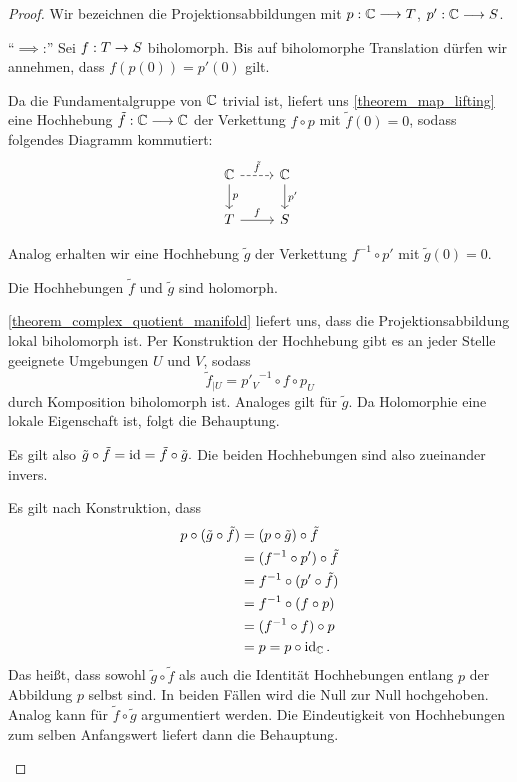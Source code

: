 \begin{proof}
	Wir bezeichnen die Projektionsabbildungen mit \(p:\mathbb{C}\longrightarrow T\), \(p':\mathbb{C}\longrightarrow S\).
	

	\enquote{\(\implies\):} 
	Sei \(f: T \rightarrow S\) biholomorph. Bis auf biholomorphe Translation dürfen wir annehmen, dass 
	\(f(p(0)) = p'(0)\) gilt.
	
	Da die Fundamentalgruppe von \(\mathbb{C}\) trivial ist, liefert uns \cref{theorem_map_lifting} eine Hochhebung \(\tilde{f}:\mathbb{C}\longrightarrow \mathbb{C}\) der Verkettung \(f\circ p\) mit $\tilde{f}(0) = 0$, sodass folgendes Diagramm kommutiert:
	\begin{equation*}
	\begin{tikzcd}
		\C 
		\ar[d,"p"] 
		\ar[r, "\tilde{f}", dashed] 
		& \C
		\ar[d,"p'"]
		\\ 
		T 
		\ar[r,"f"] 
		& S
	\end{tikzcd}
	\end{equation*}

	Analog erhalten wir eine Hochhebung $\tilde{g}$ der Verkettung $f^{-1} \circ p'$ mit $\tilde{g}(0) = 0.$ 

	\begin{claim}
		Die Hochhebungen \(\tilde{f}\) und \(\tilde{g}\) sind holomorph.
	\end{claim}
	\begin{proofofclaim}
		\cref{theorem_complex_quotient_manifold} liefert uns, dass die Projektionsabbildung lokal biholomorph ist. Per Konstruktion der Hochhebung gibt es an jeder Stelle geeignete Umgebungen $U$ und $V$, sodass \[\tilde{f}_{|U}={p'_V}^{-1}\circ f\circ p_U\] durch Komposition biholomorph ist. Analoges gilt für $\tilde{g}.$ 
		Da Holomorphie eine lokale Eigenschaft ist, folgt die Behauptung.
	\end{proofofclaim}

	\begin{claim}
		 Es gilt also \(\tilde{g} \circ \tilde{f} = \operatorname{id} = \tilde{f} \circ \tilde{g}. \) Die beiden Hochhebungen sind also zueinander invers.
	\end{claim}
	\begin{proofofclaim}
		Es gilt nach Konstruktion, dass 
		\begin{align*}
			p \circ (\tilde{g} \circ \tilde{f}) 
			&= (p \circ \tilde{g}) \circ \tilde{f} \\
			&= (f^{-1} \circ p') \circ \tilde{f} \\
			&= f^{-1} \circ (p' \circ \tilde{f}) \\
			&= f^{-1} \circ (f \circ p) \\
			&= (f^{-1} \circ f) \circ p \\
			&= p = p \circ \operatorname{id}_{\mathbb{C}}.
		\end{align*}
		Das heißt, dass sowohl \(\tilde{g} \circ \tilde{f}\) als auch die Identität Hochhebungen entlang $p$ der Abbildung $p$ selbst sind. 
		In beiden Fällen wird die Null zur Null hochgehoben. Analog kann für \(\tilde{f} \circ \tilde{g}\) argumentiert werden. Die Eindeutigkeit von Hochhebungen zum selben Anfangswert liefert dann die Behauptung.
	\end{proofofclaim}



\end{proof}
